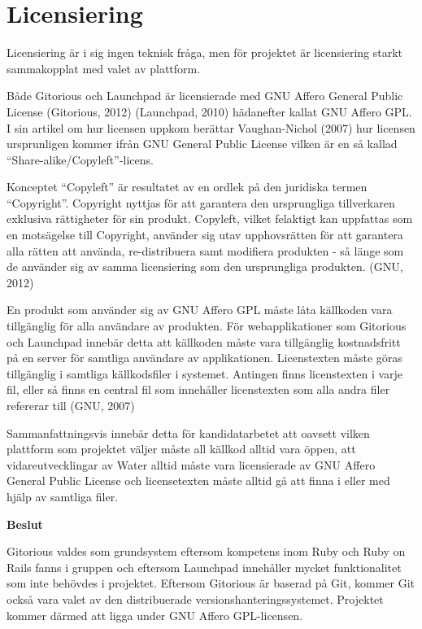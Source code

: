 \section{Licensiering}
Licensiering är i sig ingen teknisk fråga, men för projektet är licensiering starkt sammakopplat med valet av plattform. 

Både Gitorious och Launchpad är licensierade med GNU Affero General Public License (Gitorious, 2012) (Launchpad, 2010) hädanefter kallat GNU Affero GPL. I sin artikel om hur licensen uppkom berättar Vaughan-Nichol (2007) hur licensen ursprunligen kommer ifrån GNU General Public License vilken är en så kallad “Share-alike/Copyleft”-licens.

Konceptet “Copyleft” är resultatet av en  ordlek på den juridiska termen “Copyright”. Copyright nyttjas för att garantera den ursprungliga tillverkaren exklusiva rättigheter för sin produkt. Copyleft, vilket felaktigt kan uppfattas som en motsägelse till Copyright, använder sig utav upphovsrätten för att garantera alla rätten att använda, re-distribuera samt modifiera produkten - så länge som de använder sig av samma licensiering som den ursprungliga produkten. (GNU, 2012)

En produkt som använder sig av GNU Affero GPL måste låta källkoden vara tillgänglig för alla användare av produkten. För webapplikationer som Gitorious och Launchpad innebär detta att källkoden måste vara tillgänglig kostnadsfritt på en server för samtliga användare av applikationen. 
Licenstexten måste göras tillgänglig i samtliga källkodsfiler i systemet. Antingen finns licenstexten i varje fil, eller så finns en central fil som innehåller licenstexten som alla andra filer refererar till (GNU, 2007) 

Sammanfattningsvis innebär detta för kandidatarbetet att oavsett vilken plattform som projektet väljer måste all källkod alltid vara öppen, att vidareutvecklingar av Water alltid måste vara licensierade av GNU Affero General Public License och licensetexten måste alltid gå att finna i eller med hjälp av samtliga filer.

\begin{flushright}
  
  \textbf{Beslut}
  
  Gitorious valdes som grundsystem eftersom kompetens inom Ruby och Ruby on Rails fanns i gruppen och eftersom Launchpad innehåller mycket funktionalitet som inte behövdes i projektet. Eftersom Gitorious är baserad på Git, kommer Git också vara valet av den distribuerade versionshanteringssystemet. Projektet kommer därmed att ligga under GNU Affero GPL-licensen.  
  
\end{flushright}
